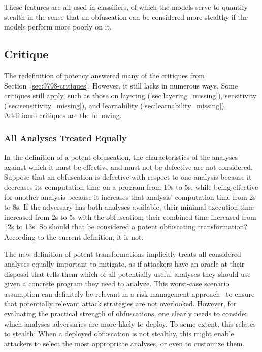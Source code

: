 These features are all used in classifiers, of which the models serve to quantify stealth in the sense that an obfuscation can be considered more stealthy if the models perform more poorly on it. 

\subsection{Critique}
\label{sec:2009-critiques}
The redefinition of potency answered many of the critiques from Section~\ref{sec:9798-critiques}. However, it still lacks in numerous ways. Some critiques still apply, such as those on layering (\ref{sec:layering_missing}), sensitivity (\ref{sec:sensitivity_missing}), and learnability (\ref{sec:learnability_missing}). Additional critiques are the following. 

\subsubsection{All Analyses Treated Equally}
\label{sec:all_equal}
In the definition of a potent obfuscation, the characteristics of the analyses against which it must be effective and must not be defective are not considered. Suppose that an obfuscation is defective with respect to one analysis because it decreases its computation time on a program from 10s to 5s, while being effective for another analysis because it increases that analysis' computation time from 2s to 8s. If the adversary has both analyses available, their minimal execution time increased from 2s to 5s with the obfuscation; their combined time increased from 12s to 13s. So should that be considered a potent obfuscating transformation? According to the current definition, it is not. 

The new definition of potent transformations implicitly treats all considered analyses equally important to mitigate, as if attackers have an oracle at their disposal that tells them which of all potentially useful analyses they should use given a concrete program they need to analyze. This worst-case scenario assumption can definitely be relevant in a risk management approach~\cite{Basile23} to ensure that potentially relevant attack strategies are not overlooked. However, for evaluating the practical strength of obfuscations, one clearly needs to consider which analyses adversaries are more likely to deploy. 
To some extent, this relates to stealth: When a deployed obfuscation is not stealthy, this might enable attackers to select the most appropriate analyses, or even to customize them. 

